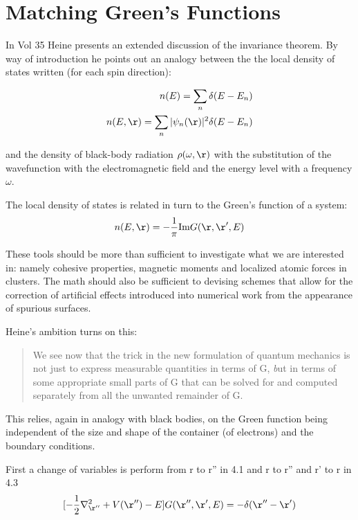 \section{Matching Green's Functions}
\label{sec:invariance}
  In Vol 35 Heine presents an extended discussion of the invariance
theorem. By way of introduction he points out an analogy between
the the local density of states written (for each spin direction):

\begin{eqnarray}
n(E) = \sum_{n}\delta(E-E_{n}) \\
n(E,\r) = \sum_{n} |\psi_{n}(\r)|^{2}\delta(E-E_{n})
\end{eqnarray}

and the density of black-body radiation $\rho(\omega,\r)$
with the substitution of the wavefunction with the electromagnetic
field and the energy level with a frequency $\omega$.

The local density of states is related in turn to the 
Green's function of a system:
\begin{equation}
n(E,\r) = -\frac{1}{\pi}{\rm Im} G(\r,\r',E)
\end{equation}

These tools should be more than sufficient to investigate what
we are interested in: namely cohesive properties, magnetic moments
and localized atomic forces in clusters. The math
should also be sufficient to devising schemes that allow for the correction
of artificial effects introduced into numerical work from the appearance
of spurious surfaces.

Heine's ambition turns on this:
\begin{quote}
We see now that the trick in the new formulation of quantum 
mechanics is not just to express measurable quantities in terms of 
G, {\emph but in terms of some appropriate small parts of G that can be solved 
for and computed separately from all the unwanted remainder of G.}
\end{quote}

This relies, again in analogy with black bodies, on the Green
function being independent of the size and shape
of the container (of electrons) and the boundary conditions.


First a change of variables is perform from r to r'' in 4.1 and r to r'' and r'
to r in 4.3
\begin{equation}
\label{eq:greentot}
[-\frac{1}{2}\nabla^{2}_{\r''} + V(\r'') - E]G(\r'',\r',E)= -\delta(\r''-\r')
\end{equation}

